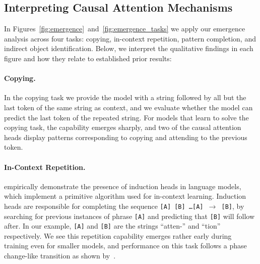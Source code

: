 \documentclass{article}
\newcommand{\xxcomment}[4]{}
\newcommand{\vatsal}[1]{}
\newcommand{\xxcomment}[4]{\textcolor{#1}{[$^{\textsc{#2}}_{\textsc{#3}}$ #4]}}
\newcommand{\vatsal}[1]{\xxcomment{pinkypink}{V}{B}{#1}}
\begin{document}
\subsection{Interpreting Causal Attention Mechanisms}
\label{app:interp}
In Figures~\ref{fig:emergence}~and~\ref{fig:emergence_tasks} we apply our emergence analysis across four tasks: copying, in-context repetition, pattern completion, and indirect object identification. Below, we interpret the qualitative findings in each figure and how they relate to established prior results:

\paragraph{Copying.}
In the copying task we provide the model with a string followed by all but the last token of the same string as context, and we evaluate whether the model can predict the last token of the repeated string. For models that learn to solve the copying task, the capability emerges sharply, and two of the causal attention heads display patterns corresponding to copying and attending to the previous token.

\paragraph{In-Context Repetition.} 
\citet{olsson2022incontextlearninginductionheads} empirically demonstrate the presence of induction heads in language models, which implement a primitive algorithm used for in-context learning. Induction heads are responsible for completing the sequence \texttt{[A] [B] \dots [A] $\rightarrow$ [B]}, by searching for previous instances of phrase \texttt{[A]} and predicting that \texttt{[B]} will follow after. In our example, \texttt{[A]}  and \texttt{[B]} are the strings ``atten-'' and ``tion'' respectively. We see this repetition capability emerges rather early during training even for smaller models, and performance on this task follows a phase change-like transition as shown by~\citet{olsson2022incontextlearninginductionheads}.
\end{document}
